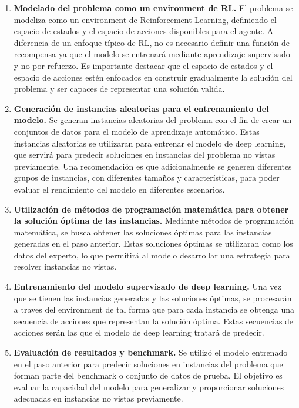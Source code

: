 \begin{enumerate}
    \item \textbf{Modelado del problema como un environment de RL.} El problema 
    se modeliza como un environment de Reinforcement Learning, definiendo el espacio de estados 
    y el espacio de acciones disponibles para el agente. A diferencia de un enfoque típico de RL, 
    no es necesario definir una función de recompensa ya que el modelo se entrenará mediante aprendizaje 
    supervisado y no por refuerzo. Es importante destacar que el espacio de estados y el espacio de
    acciones estén enfocados en construir gradualmente la solución del problema y ser capaces
    de representar una solución valida.
    \item \textbf{Generación de instancias aleatorias para el entrenamiento del modelo.} 
    Se generan instancias aleatorias del problema con el fin de crear un conjuntos de datos 
    para el modelo de aprendizaje automático. Estas instancias aleatorias se utilizaran para entrenar el 
    modelo de deep learning, que servirá para predecir soluciones en instancias del problema no vistas 
    previamente. Una recomendación es que adicionalmente se generen diferentes grupos de instancias,
    con diferentes tamaños y características, para poder evaluar el rendimiento del modelo en diferentes
    escenarios.
    \item \textbf{Utilización de métodos de programación matemática para obtener la solución óptima de 
    las instancias.} Mediante métodos de programación matemática, se busca obtener las soluciones óptimas 
    para las instancias generadas en el paso anterior. Estas soluciones óptimas se utilizaran como los 
    datos del experto, lo que permitirá al modelo desarrollar una estrategia para resolver instancias no vistas.
    \item \textbf{Entrenamiento del modelo supervisado de deep learning.} Una vez que se tienen las instancias
    generadas y las soluciones óptimas, se procesarán a traves del environment de tal forma que para cada
    instancia se obtenga una secuencia de acciones que representan la solución óptima. Estas secuencias de
    acciones serán las que el modelo de deep learning tratará de predecir.
    \item \textbf{Evaluación de resultados y benchmark.} Se utilizó el modelo entrenado 
    en el paso anterior para predecir soluciones en instancias del problema que forman parte del benchmark 
    o conjunto de datos de prueba. El objetivo es evaluar la capacidad del modelo para generalizar y 
    proporcionar soluciones adecuadas en instancias no vistas previamente.
\end{enumerate}

